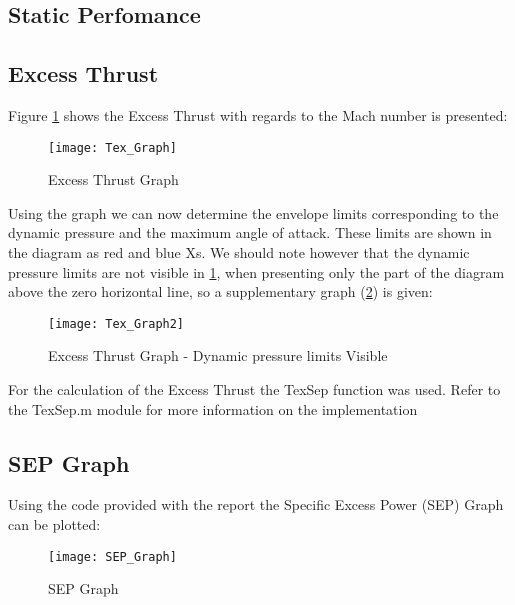 \subsection{Static Perfomance}

\subsection{Excess Thrust}

Figure \ref{fig:Tex_Graph} shows the Excess Thrust with regards to the Mach number is presented:

\begin{figure}[H]
    \centering
    \hspace*{-2cm}
    \texttt{[image: Tex\_Graph]}
    \caption{Excess Thrust Graph}
    \label{fig:Tex_Graph}
\end{figure}

Using the graph we can now determine the envelope limits corresponding to the dynamic pressure and the 
maximum angle of attack. These limits are shown in the diagram as red and blue Xs.
We should note however that the dynamic pressure limits are not visible in  \ref{fig:Tex_Graph}, when presenting 
only the part of the diagram above the zero horizontal line, so a supplementary graph (\ref{fig:Tex_Graph2}) is given:

\begin{figure}[H]
    \centering
    \hspace*{-2cm}
    \texttt{[image: Tex\_Graph2]}
    \caption{Excess Thrust Graph - Dynamic pressure limits Visible}
    \label{fig:Tex_Graph2}
\end{figure}

\noindent For the calculation of the Excess Thrust the TexSep function was used. Refer to the TexSep.m module 
for more information on the implementation

\subsection{SEP Graph}

Using the code provided with the report the Specific Excess Power (SEP) Graph
can be plotted:

\begin{figure}[H]
    \centering
    \hspace*{-2cm}
    \texttt{[image: SEP\_Graph]}
    \caption{SEP Graph}
    \label{fig:SEP_Graph}
\end{figure}

